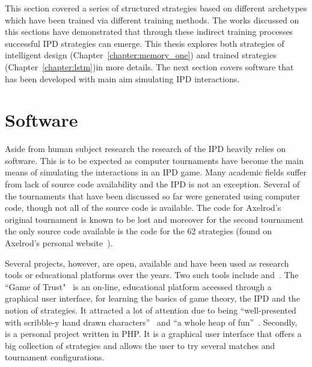 This section covered a series of structured strategies based on different
archetypes which have been trained via different training methods. The works
discussed on this sections have demonstrated that through these indirect
training processes successful IPD strategies can emerge. This thesis explores
both strategies of intelligent design (Chapter~\ref{chapter:memory_one}) and
trained strategies (Chapter~\ref{chapter:lstm})in more details. The next section
covers software that has been developed with main aim simulating IPD
interactions.

\section{Software}\label{section:software}

Aside from human subject research the research of the IPD heavily relies on software.
This is to be expected as computer tournaments have become the main
means of simulating the interactions in an IPD game.
Many academic fields suffer from lack of source code availability and the IPD
is not an exception. Several of the tournaments that have been discussed so far were generated
using computer code, though not all of the source code is available.
The code for Axelrod's original tournament is known to be lost and
moreover for the second tournament the only source code available is the code
for the 62 strategies (found on Axelrod's personal website~\cite{fortan_code}).

Several projects, however, are open, available and have been used as research
tools or educational platforms over the years. Two such tools include
\cite{pd_trust} and~\cite{trust_blogb}.
The ``Game of Trust"~\cite{pd_trust} is an on-line, educational platform accessed 
through a graphical user interface,
for learning the basics of game theory, the IPD
and the notion of strategies. It attracted a lot of attention
due to being ``well-presented with scribble-y hand drawn
characters''~\cite{trust_blogb} and ``a whole heap of fun''~\cite{trust_bloga}.
Secondly,~\cite{pd_game} is a personal project written in PHP. It is a graphical user
interface that offers a big collection of strategies and allows the user to try
several matches and tournament configurations.

